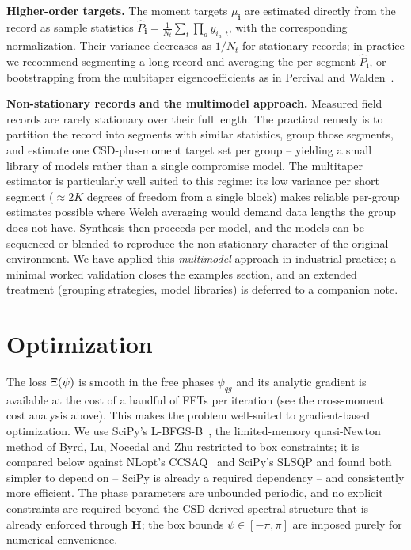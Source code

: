 \documentclass[10pt,a4paper]{article}
\numberwithin{equation}{section}
\DeclarePairedDelimiter\mat{(}{)}
\begin{document}
\textbf{Higher-order targets.} The moment targets $\mu_\mathbf{i}$ are estimated directly from the record as sample statistics $\hat P_\mathbf{i} = \frac{1}{N_t}\sum_t \prod_a y_{i_a, t}$, with the corresponding normalization. Their variance decreases as $1/N_t$ for stationary records; in practice we recommend segmenting a long record and averaging the per-segment $\hat P_\mathbf{i}$, or bootstrapping from the multitaper eigencoefficients as in Percival and Walden~\cite{percival_walden_1993}.

\textbf{Non-stationary records and the multimodel approach.} Measured field records are rarely stationary over their full length. The practical remedy is to partition the record into segments with similar statistics, group those segments, and estimate one CSD-plus-moment target set per group -- yielding a small library of models rather than a single compromise model. The multitaper estimator is particularly well suited to this regime: its low variance per short segment (${\approx}2K$ degrees of freedom from a single block) makes reliable per-group estimates possible where Welch averaging would demand data lengths the group does not have. Synthesis then proceeds per model, and the models can be sequenced or blended to reproduce the non-stationary character of the original environment. We have applied this \emph{multimodel} approach in industrial practice; a minimal worked validation closes the examples section, and an extended treatment (grouping strategies, model libraries) is deferred to a companion note.

\section*{Optimization}
The loss $\Xi\mat{\psi}$ is smooth in the free phases $\psi_{q g}$ and its analytic gradient is available at the cost of a handful of FFTs per iteration (see the cross-moment cost analysis above). This makes the problem well-suited to gradient-based optimization. We use SciPy's L-BFGS-B~\cite{byrd1995lbfgsb,virtanen2020SciPy}, the limited-memory quasi-Newton method of Byrd, Lu, Nocedal and Zhu restricted to box constraints; it is compared below against NLopt's CCSAQ~\cite{svanberg2002ccsaq,johnson_nlopt} and SciPy's SLSQP and found both simpler to depend on -- SciPy is already a required dependency -- and consistently more efficient. The phase parameters are unbounded periodic, and no explicit constraints are required beyond the CSD-derived spectral structure that is already enforced through $\mathbf{H}$; the box bounds $\psi\in[-\pi,\pi]$ are imposed purely for numerical convenience.
\end{document}
